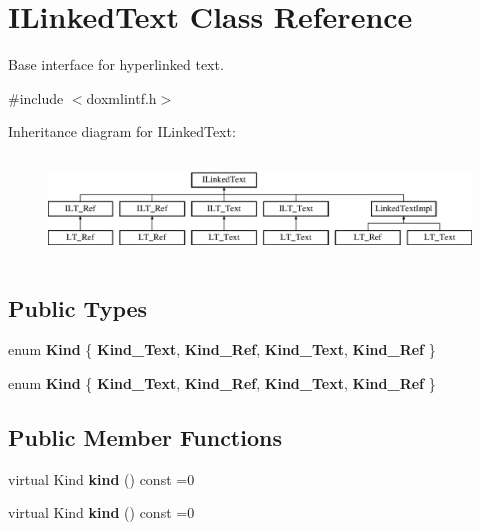 \hypertarget{class_i_linked_text}{}\section{I\+Linked\+Text Class Reference}
\label{class_i_linked_text}


Base interface for hyperlinked text.  




{\ttfamily \#include $<$doxmlintf.\+h$>$}

Inheritance diagram for I\+Linked\+Text\+:\begin{figure}[H]
\begin{center}
\leavevmode
\includegraphics[height=2.745098cm]{class_i_linked_text}
\end{center}
\end{figure}
\subsection*{Public Types}
\begin{DoxyCompactItemize}
\item 
\mbox{\label{class_i_linked_text_af18c37822f4819c58c07b327b459c5af}} 
enum {\bfseries Kind} \{ {\bfseries Kind\+\_\+\+Text}, 
{\bfseries Kind\+\_\+\+Ref}, 
{\bfseries Kind\+\_\+\+Text}, 
{\bfseries Kind\+\_\+\+Ref}
 \}
\item 
\mbox{\label{class_i_linked_text_af18c37822f4819c58c07b327b459c5af}} 
enum {\bfseries Kind} \{ {\bfseries Kind\+\_\+\+Text}, 
{\bfseries Kind\+\_\+\+Ref}, 
{\bfseries Kind\+\_\+\+Text}, 
{\bfseries Kind\+\_\+\+Ref}
 \}
\end{DoxyCompactItemize}
\subsection*{Public Member Functions}
\begin{DoxyCompactItemize}
\item 
\mbox{\label{class_i_linked_text_a0644b90dc74abe778bf2d58e1f0895bc}} 
virtual Kind {\bfseries kind} () const =0
\item 
\mbox{\label{class_i_linked_text_a0644b90dc74abe778bf2d58e1f0895bc}} 
virtual Kind {\bfseries kind} () const =0
\end{DoxyCompactItemize}


